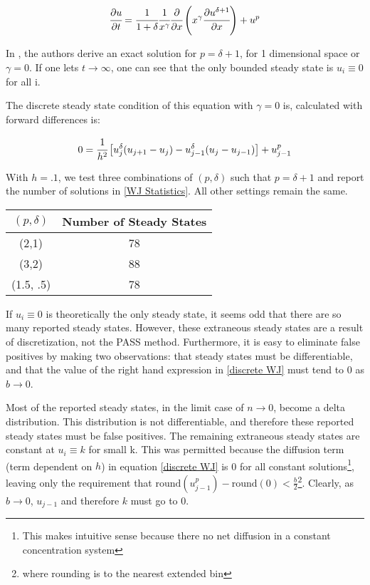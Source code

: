 \documentclass[11pt]{article}
\begin{document}
\begin{equation}
  \label{Simplified WJ}
  \cfrac{\partial{u}}{\partial{t}} = \cfrac{1}{1+\delta} \cfrac{1}{x^\gamma} \cfrac{\partial}{\partial{x}}\left(x^\gamma \cfrac{\partial{u^{\delta + 1}}}{\partial{x}} \right) + u^p
\end{equation}

In \citep{WJ}, the authors derive an exact solution for $p = \delta + 1$, for 1 dimensional space or $\gamma = 0$. If one lets $t \rightarrow \infty$, one can see that the only bounded steady state is $u_i \equiv 0$ for all i.

The discrete steady state condition of this equation with $\gamma = 0$ is, calculated with forward differences is:

\begin{equation}
  \label{discrete WJ}
  0 = \cfrac{1}{h^2} \left[ u_{j}^\delta (u_{j+1} - u_{j}) - u_{j-1}^\delta (u_{j} - u_{j-1}) \right] + u_{j-1}^p
\end{equation}

With $h = .1$, we test three combinations of $(p, \delta)$ such that $p = \delta + 1$ and report the number of solutions in \cref{WJ Statistics}. All other settings remain the same.

\begin{table*}
\begin{center}
\label{WJ Statistics}
\begin{tabular}{ | c | c | }
\hline
$(p, \delta)$ & Number of Steady States \\
\hline
(2,1) & 78 \\
\hline
(3,2) & 88 \\ 
\hline
(1.5, .5) & 78 \\
\hline
\end{tabular}
\setcounter{table}{1}
\caption{$(p, \delta)$ vs. Number of numerical steady states given $h = .1$}
\end{center}
\end{table*}

If $u_i \equiv 0$ is theoretically the only steady state, it seems odd that there are so many reported steady states. However, these extraneous steady states are a result of discretization, not the PASS method. Furthermore, it is easy to eliminate false positives by making two observations: that steady states must be differentiable, and that the value of the right hand expression in \cref{discrete WJ} must tend to 0 as $b \rightarrow 0$. 

Most of the reported steady states, in the limit case of $n \rightarrow 0$, become a delta distribution. This distribution is not differentiable, and therefore these reported steady states must be false positives. The remaining extraneous steady states are constant at $u_i \equiv k$ for small k. This was permitted because the diffusion term (term dependent on $h$) in equation \cref{discrete WJ} is 0 for all constant solutions\footnote{This makes intuitive sense because there no net diffusion in a constant concentration system}, leaving only the requirement that $\text{round}(u_{j-1}^p) - \text{round}(0) < \frac{b}{2}$\footnote{where rounding is to the nearest extended bin}. Clearly, as $b \rightarrow 0$, $u_{j-1}$ and therefore $k$ must go to 0.
\end{document}
